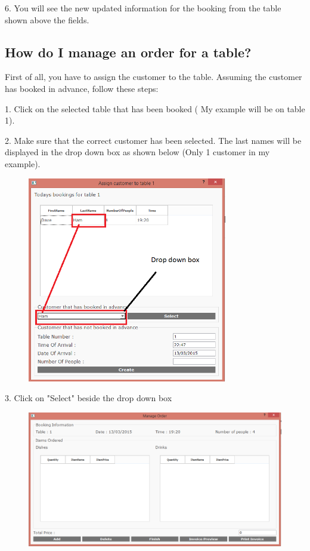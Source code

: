 6. You will see the new updated information for the booking from the table shown above the fields.

\newpage
\subsection{How do I manage an order for a table?}
First of all, you have to assign the customer to the table. Assuming the customer has booked in advance, follow these steps:

1. Click on the selected table that has been booked ( My example will be on table 1).

2. Make sure that the correct customer has been selected. The last names will be displayed in the drop down box as shown below (Only 1 customer in my example).
\begin{figure}[H]
    \includegraphics[height = 9cm]{./Manual/images/assignExample1} 
    \caption{} \label{fig:assignex1}
\end{figure}

3. Click on "Select" beside the drop down box

\begin{figure}[H]
    \includegraphics[width = 12cm]{./Manual/images/base/assignExample2} 
    \caption{} \label{fig:assignex2}
\end{figure}

